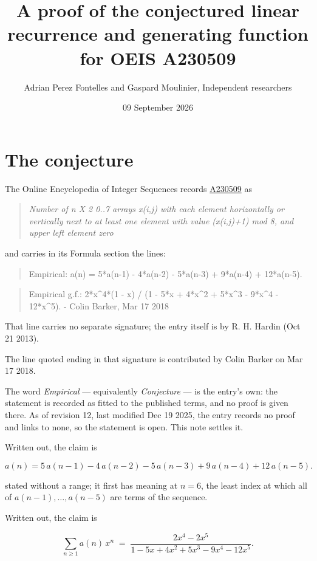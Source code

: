 \documentclass[11pt]{article}
\title{A proof of the conjectured linear recurrence and generating function for OEIS A230509}
\author{Adrian Perez Fontelles and Gaspard Moulinier, Independent researchers}
\date{09 September 2026}
\theoremstyle{definition}
\begin{document}
\maketitle
\section{The conjecture}

The Online Encyclopedia of Integer Sequences records \href{https://oeis.org/A230509}{A230509} as

\begin{quote}\itshape Number of n X 2 0..7 arrays x(i,j) with each element horizontally or vertically next to at least one element with value (x(i,j)+1) mod 8, and upper left element zero\end{quote}

and carries in its Formula section the lines:

\begin{quote}\ttfamily Empirical: a(n) = 5*a(n-1) - 4*a(n-2) - 5*a(n-3) + 9*a(n-4) + 12*a(n-5).\end{quote}

\begin{quote}\ttfamily Empirical g.f.: 2*x\textasciicircum{}4*(1 - x) / (1 - 5*x + 4*x\textasciicircum{}2 + 5*x\textasciicircum{}3 - 9*x\textasciicircum{}4 - 12*x\textasciicircum{}5). - Colin Barker, Mar 17 2018\end{quote}

That line carries no separate signature; the entry itself is by R. H. Hardin (Oct 21 2013).

The line quoted ending in that signature is contributed by Colin Barker on Mar 17 2018.

The word {\itshape Empirical} --- equivalently {\itshape Conjecture} --- is the entry's own: the statement is recorded as fitted to the published terms, and no proof is given there. As of revision 12, last modified Dec 19 2025, the entry records no proof and links to none, so the statement is open. This note settles it.

Written out, the claim is

\[a(n) = 5\,a(n-1) - 4\,a(n-2) - 5\,a(n-3) + 9\,a(n-4) + 12\,a(n-5).\]

stated without a range; it first has meaning at $n = 6$, the least index at which all of $a(n-1),\dots,a(n-5)$ are terms of the sequence.

Written out, the claim is

\[\sum_{n \ge 1} a(n)\,x^n \;=\; \frac{2x^{4} - 2x^{5}}{1 - 5x + 4x^{2} + 5x^{3} - 9x^{4} - 12x^{5}}.\]
\end{document}
